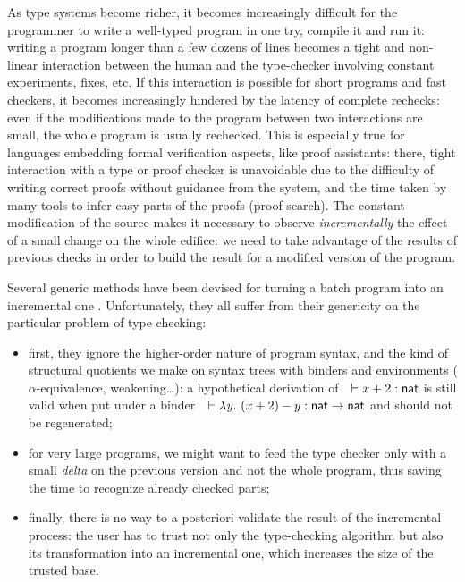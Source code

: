 \documentclass{llncs}
\begin{document}
As type systems become richer, it becomes increasingly difficult for
the programmer to write a well-typed program in one try, compile it
and run it: writing a program longer than a few dozens of lines
becomes a tight and non-linear interaction between the human and the
type-checker involving constant experiments, fixes, etc. If this
interaction is possible for short programs and fast checkers, it
becomes increasingly hindered by the latency of complete rechecks:
even if the modifications made to the program between two interactions
are small, the whole program is usually rechecked. This is especially
true for languages embedding formal verification aspects, like proof
assistants: there, tight interaction with a type or proof checker is
unavoidable due to the difficulty of writing correct proofs without
guidance from the system, and the time taken by many tools to infer
easy parts of the proofs (proof search). The constant modification of
the source makes it necessary to observe \emph{incrementally} the
effect of a small change on the whole edifice: we need to take
advantage of the results of previous checks in order to build the
result for a modified version of the program.

Several generic methods have been devised for turning a batch program
into an incremental one
\cite{pugh1989incremental,acar2003selective}. Unfortunately, they all
suffer from their genericity on the particular problem of type
checking:
\begin{itemize}
\item first, they ignore the higher-order nature of program syntax,
  and the kind of structural quotients we make on syntax trees with
  binders and environments ($\alpha$-equivalence, weakening\ldots): a
  hypothetical derivation of\ \ $\vdash x+2 : \text{\textsf{nat}}$ is still valid
  when put under a binder\ \ $\vdash\lambda{\ensuremath{\text{\textit{y}}}}.\  (x + 2) -
  y:\text{\textsf{nat}}\to\text{\textsf{nat}}$ and should not be regenerated;
\item for very large programs, we might want to feed the type checker
  only with a small \emph{delta} on the previous version and not the
  whole program, thus saving the time to recognize already checked
  parts;
\item finally, there is no way to a posteriori validate the result of
  the incremental process: the user has to trust not only the
  type-checking algorithm but also its transformation into an
  incremental one, which increases the size of the trusted base.
\end{itemize}
\end{document}
